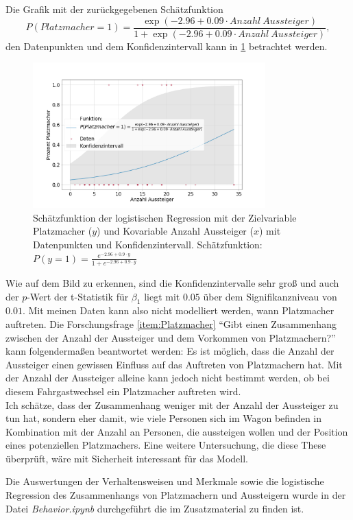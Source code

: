 Die Grafik mit der zurückgegebenen Schätzfunktion $$P(Platzmacher=1) = \frac{\exp(-2.96+0.09 \cdot Anzahl \ Aussteiger)}{1+\exp(-2.96+0.09 \cdot Anzahl \ Aussteiger)},$$
den Datenpunkten und dem Konfidenzintervall kann in \figurename \ref{fig:LogRegPM} betrachtet werden.
\begin{figure}[H]
	\centering
		\includegraphics[width=0.8\textwidth]{pictures/data_evaluation/behavior/log_reg_spacemaker.png}
	\caption{Schätzfunktion der logistischen Regression mit der Zielvariable Platzmacher ($y$) und Kovariable Anzahl Aussteiger ($x$) mit Datenpunkten und Konfidenzintervall. Schätzfunktion: $P(y=1) = \frac{e^{-2.96+0.9 \cdot y}}{1 + e^{-2.96 + 0.9 \cdot y}}$}
	\label{fig:LogRegPM}
\end{figure}
Wie auf dem Bild zu erkennen, sind die Konfidenzintervalle sehr groß und auch der $p$-Wert der t-Statistik für $\beta_1$ liegt mit $0.05$ über dem Signifikanzniveau von $0.01$. Mit meinen Daten kann also nicht modelliert werden, wann Platzmacher auftreten. Die Forschungsfrage \ref{item:Platzmacher} "`Gibt einen Zusammenhang zwischen der Anzahl der Aussteiger und dem Vorkommen von Platzmachern?"' kann folgendermaßen beantwortet werden:
Es ist möglich, dass die Anzahl der Aussteiger einen gewissen Einfluss auf das Auftreten von Platzmachern hat. Mit der Anzahl der Aussteiger alleine kann jedoch nicht bestimmt werden, ob bei diesem Fahrgastwechsel ein Platzmacher auftreten wird.\\
Ich schätze, dass der Zusammenhang weniger mit der Anzahl der Aussteiger zu tun hat, sondern eher damit, wie viele Personen sich im Wagon befinden in Kombination mit der Anzahl an Personen, die aussteigen wollen und der Position eines potenziellen Platzmachers. Eine weitere Untersuchung, die diese These überprüft, wäre mit Sicherheit interessant für das Modell.

Die Auswertungen der Verhaltensweisen und Merkmale sowie die logistische Regression des Zusammenhangs von Platzmachern und Aussteigern wurde in der Datei \textsl{Behavior.ipynb} durchgeführt die im Zusatzmaterial zu finden ist.

